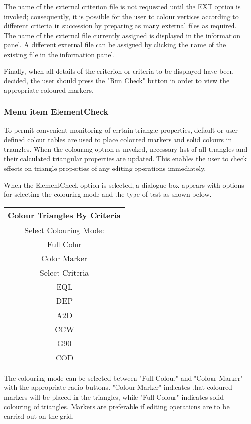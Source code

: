 \documentclass{article}
\begin{document}
The name of the external criterion file is not requested until the EXT option is invoked; consequently, it is possible for the user to colour vertices according to different criteria in succession by preparing as many external files as required. The name of the external file currently assigned is displayed in the information panel. A different external file can be assigned by clicking the name of the existing file in the information panel.

Finally, when all details of the criterion or criteria to be displayed have been decided, the user should press the "Run Check" button in order to view the appropriate coloured markers. 

\subsubsection{Menu item ElementCheck}

To permit convenient monitoring of certain triangle properties, default or user defined colour tables are used to place coloured markers and solid colours in triangles. When the colouring option is invoked, necessary list of all triangles and their calculated triangular properties are updated. This enables the user to check effects on triangle properties of any editing operations immediately.

When the ElementCheck option is selected, a dialogue box appears with options for selecting the colouring mode and the type of test as shown below.

\begin{center}
 \begin{tabular}{| c |}
\hline
Colour Triangles By Criteria\\
\hline
Select Colouring Mode:\\
\hline
\indent	Full Color\\
\indent	Color Marker\\
\hline
Select Criteria\\
\hline
\indent	EQL\\
\indent	DEP\\
\indent	A2D\\
\indent	CCW \\
\indent	G90\\
\indent	COD\\
\hline
 \end{tabular}
\end{center}

The colouring mode can be selected between "Full Colour" and "Colour Marker" with the appropriate radio buttons.  "Colour Marker" indicates that coloured markers will be placed in the triangles, while "Full Colour" indicates solid colouring of triangles. Markers are preferable if editing operations are to be carried out on the grid.
\end{document}
